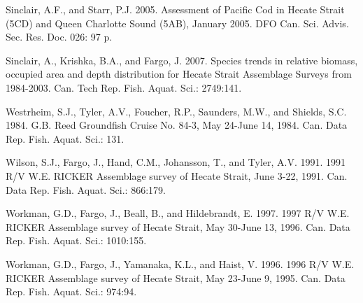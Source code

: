 \documentclass[11pt]{book}
\begin{document}
\leavevmode\hypertarget{ref-sinclair2005}{}%
Sinclair, A.F., and Starr, P.J. 2005. Assessment of Pacific Cod in Hecate Strait (5CD) and Queen Charlotte Sound (5AB), January 2005. DFO Can. Sci. Advis. Sec. Res. Doc. 026: 97 p.

\leavevmode\hypertarget{ref-sinclair2007}{}%
Sinclair, A., Krishka, B.A., and Fargo, J. 2007. Species trends in relative biomass, occupied area and depth distribution for Hecate Strait Assemblage Surveys from 1984-2003. Can. Tech Rep. Fish. Aquat. Sci.: 2749:141.

\leavevmode\hypertarget{ref-westrheim1984}{}%
Westrheim, S.J., Tyler, A.V., Foucher, R.P., Saunders, M.W., and Shields, S.C. 1984. G.B. Reed Groundfish Cruise No. 84-3, May 24-June 14, 1984. Can. Data Rep. Fish. Aquat. Sci.: 131.

\leavevmode\hypertarget{ref-wilson1991}{}%
Wilson, S.J., Fargo, J., Hand, C.M., Johansson, T., and Tyler, A.V. 1991. 1991 R/V W.E. RICKER Assemblage survey of Hecate Strait, June 3-22, 1991. Can. Data Rep. Fish. Aquat. Sci.: 866:179.

\leavevmode\hypertarget{ref-workman1997}{}%
Workman, G.D., Fargo, J., Beall, B., and Hildebrandt, E. 1997. 1997 R/V W.E. RICKER Assemblage survey of Hecate Strait, May 30-June 13, 1996. Can. Data Rep. Fish. Aquat. Sci.: 1010:155.

\leavevmode\hypertarget{ref-workman1996}{}%
Workman, G.D., Fargo, J., Yamanaka, K.L., and Haist, V. 1996. 1996 R/V W.E. RICKER Assemblage survey of Hecate Strait, May 23-June 9, 1995. Can. Data Rep. Fish. Aquat. Sci.: 974:94.

\setlength{\parindent}{0in} \setlength{\leftskip}{0in} \setlength{\parskip}{4pt}

\end{document}
